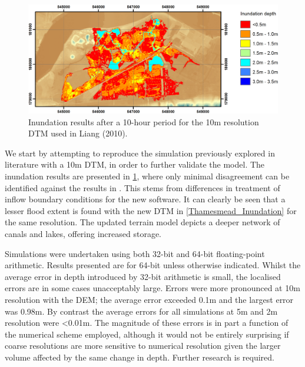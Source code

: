 \documentclass[11pt,english,a4paper]{article}
\begin{document}
\begin{figure}[tpb]
\centering
\includegraphics[width=1.0\textwidth]{Thamesmead_10m_Comparison.png}
\caption{Inundation results after a 10-hour period for the 10m resolution DTM used in Liang (2010).}
\label{Thamesmead_10m_Comparison}
\end{figure}

We start by attempting to reproduce the simulation previously explored in literature with a 10m DTM, in order to further validate the model. The inundation results are presented in \ref{Thamesmead_10m_Comparison}, where only minimal disagreement can be identified against the results in \citet{Liang2010a}. This stems from differences in treatment of inflow boundary conditions for the new software. It can clearly be seen that a lesser flood extent is found with the new DTM in \ref{Thamesmead_Inundation} for the same resolution. The updated terrain model depicts a deeper network of canals and lakes, offering increased storage. 

Simulations were undertaken using both 32-bit and 64-bit floating-point arithmetic. Results presented are for 64-bit unless otherwise indicated. Whilst the average error in depth introduced by 32-bit arithmetic is small, the localised errors are in some cases unacceptably large. Errors were more pronounced at 10m resolution with the DEM; the average error exceeded 0.1m and the largest error was 0.98m. By contrast the average errors for all simulations at 5m and 2m resolution were \textless 0.01m. The magnitude of these errors is in part a function of the numerical scheme employed, although it would not be entirely surprising if coarse resolutions are more sensitive to numerical resolution given the larger volume affected by the same change in depth. Further research is required. 
\end{document}
